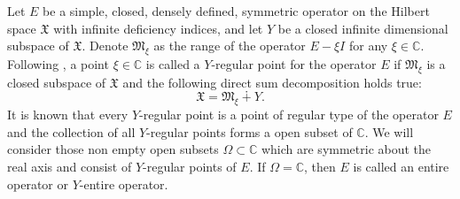 \documentclass [12pt,reqno]{amsart}
\numberwithin{equation}{subsection}
\numberwithin{equation}{section}
\begin{document}
Let \(E\) be a simple, closed, densely defined, symmetric operator on the Hilbert space \(\mathfrak{X}\) with infinite deficiency indices, and let $Y$ be a closed infinite dimensional subspace of $\mathfrak{X}$. Denote \(\mathfrak{M}_\xi\) as the range of the operator \(E-\xi I\) for any \(\xi \in \mathbb{C}\). Following \cite[Appendix 1]{kreinlect}, a point $\xi \in \mathbb{C}$ is called a $Y$-regular point for the operator $E$ if $\mathfrak{M}_{\xi}$ is a closed subspace of $\mathfrak{X}$ and the following direct sum decomposition holds true: \begin{equation} \label{Equation 3.2}
\mathfrak{X}= \mathfrak{M}_\xi \dotplus Y .
\end{equation} 
It is known that every $Y$-regular point is a point of regular type of the operator $E$ and the collection of all $Y$-regular points forms a open subset of $\mathbb{C}$. We will consider those non empty open subsets $\Omega \subset \mathbb{C}$ which are symmetric about the real axis and consist of $Y$-regular points of $E$. If $\Omega= \mathbb{C}$, then $E$ is called an entire operator or $Y$-entire operator.
\end{document}
